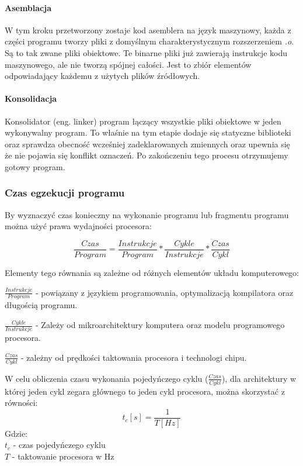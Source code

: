 \paragraph{Asemblacja}

W tym kroku przetworzony zostaje kod asemblera na język maszynowy, każda z części programu tworzy pliki z domyślnym charakterystycznym rozszerzeniem \textit{.o}.
Są to tak zwane pliki obiektowe.
Te binarne pliki już zawierają instrukcje kodu maszynowego, ale nie tworzą spójnej całości. Jest to zbiór elementów odpowiadający każdemu z użytych plików źródłowych.

\paragraph{Konsolidacja}
Konsolidator (eng. linker) program łączący wszystkie pliki obiektowe w jeden wykonywalny program. To właśnie na tym etapie dodaje się statyczne biblioteki oraz sprawdza obecność wcześniej zadeklarowanych zmiennych oraz upewnia się że nie pojawia się konflikt oznaczeń. Po zakończeniu tego procesu otrzymujemy gotowy program. 


\subsubsection{Czas egzekucji programu}

By wyznaczyć czas konieczny na wykonanie programu lub fragmentu programu można użyć prawa wydajności procesora\cite{arch}:

\begin{equation}
        \label{Iron Law}
        \frac{Czas}{Program} =  \frac{Instrukcje}{Program} * \frac{Cykle}{Instrukcje} * \frac{Czas}{Cykl}
\end{equation}

Elementy tego równania są zależne od różnych elementów układu komputerowego:
\begin{description}
        \item $\frac{Instrukcje}{Program}$ - powiązany z językiem programowania, optymalizacją kompilatora oraz długością programu. 
        \item $\frac{Cykle}{Instrukcje}$ - Zależy od mikroarchitektury komputera oraz modelu programowego procesora.
        \item $\frac{Czas}{Cykl}$ -  zależny od prędkości taktowania procesora i technologi chipu. 
\end{description} 


W celu obliczenia czasu wykonania pojedyńczego cyklu ($\frac{Czas}{Cykl}$), dla architektury w której jeden cykl zegara głównego to jeden cykl procesora, można skorzystać z równości:
\begin{equation}
        \label{Cykli w sec}
        t_c [s]= \frac{1}{T [Hz]}
\end{equation} 
Gdzie:\\
\indent $t_c$ - czas pojedyńczego cyklu \\
\indent $T$ - taktowanie procesora w Hz

